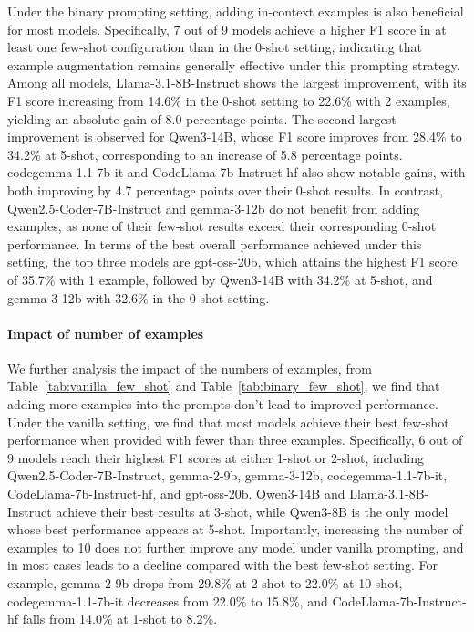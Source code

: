 \documentclass[acmsmall,screen,review,anonymous]{acmart}
\begin{document}
% 
Under the binary prompting setting, adding in-context examples is also beneficial for most models. Specifically, 7 out of 9 models achieve a higher F1 score in at least one few-shot configuration than in the 0-shot setting, indicating that example augmentation remains generally effective under this prompting strategy. Among all models, Llama-3.1-8B-Instruct shows the largest improvement, with its F1 score increasing from 14.6\% in the 0-shot setting to 22.6\% with 2 examples, yielding an absolute gain of 8.0 percentage points. The second-largest improvement is observed for Qwen3-14B, whose F1 score improves from 28.4\% to 34.2\% at 5-shot, corresponding to an increase of 5.8 percentage points. codegemma-1.1-7b-it and CodeLlama-7b-Instruct-hf also show notable gains, with both improving by 4.7 percentage points over their 0-shot results. In contrast, Qwen2.5-Coder-7B-Instruct and gemma-3-12b do not benefit from adding examples, as none of their few-shot results exceed their corresponding 0-shot performance. In terms of the best overall performance achieved under this setting, the top three models are gpt-oss-20b, which attains the highest F1 score of 35.7\% with 1 example, followed by Qwen3-14B with 34.2\% at 5-shot, and gemma-3-12b with 32.6\% in the 0-shot setting.




\paragraph{Impact of number of examples}


We further analysis the impact of the numbers of examples, from Table~\ref{tab:vanilla_few_shot} and Table~\ref{tab:binary_few_shot}, we find that adding more examples into the prompts don't lead to improved performance. Under the vanilla setting, we find that most models achieve their best few-shot performance when provided with fewer than three examples. Specifically, 6 out of 9 models reach their highest F1 scores at either 1-shot or 2-shot, including Qwen2.5-Coder-7B-Instruct, gemma-2-9b, gemma-3-12b, codegemma-1.1-7b-it, CodeLlama-7b-Instruct-hf, and gpt-oss-20b. Qwen3-14B and Llama-3.1-8B-Instruct achieve their best results at 3-shot, while Qwen3-8B is the only model whose best performance appears at 5-shot. Importantly, increasing the number of examples to 10 does not further improve any model under vanilla prompting, and in most cases leads to a decline compared with the best few-shot setting. For example, gemma-2-9b drops from 29.8\% at 2-shot to 22.0\% at 10-shot, codegemma-1.1-7b-it decreases from 22.0\% to 15.8\%, and CodeLlama-7b-Instruct-hf falls from 14.0\% at 1-shot to 8.2\%.
\end{document}
